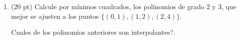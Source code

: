 \documentclass[11pt]{article}
\begin{document}
\begin{enumerate}

\newpage
\item
(20 pt) Calcule por m\'inimos cuadrados, los polinomios de grado  2 y 3, que mejor se ajusten a los puntos $\{(0,1),(1,2),(2,4)\}$.

\textquestiondown Cuales de los polinomios anteriores son interpolantes?.



\end{enumerate}
\end{document}
